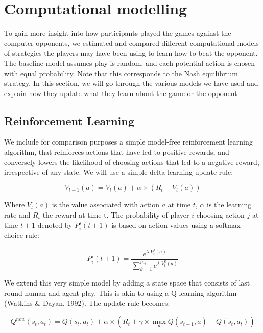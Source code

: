 \documentclass[man,floatsintext]{apa6}
\begin{document}
\newpage

\hypertarget{computational-modelling}{%
\section{Computational modelling}\label{computational-modelling}}

To gain more insight into how participants played the games against the computer opponents, we estimated and compared different computational models of strategies the players may have been using to learn how to beat the opponent. The baseline model assumes play is random, and each potential action is chosen with equal probability. Note that this corresponds to the Nash equilibrium strategy. In this section, we will go through the various models we have used and explain how they update what they learn about the game or the opponent

\hypertarget{reinforcement-learning}{%
\subsection{Reinforcement Learning}\label{reinforcement-learning}}

We include for comparison purposes a simple model-free reinforcement learning algorithm, that reinforces actions that have led to positive rewards, and conversely lowers the likelihood of choosing actions that led to a negative reward, irrespective of any state. We will use a simple delta learning update rule:

\[ V_{t+1}(a) = V_{t}(a) + \alpha \times ( R_{t}  - V_{t}(a)) \]

Where \(V_{t}(a)\) is the value associated with action \(a\) at time \(t\), \(\alpha\) is the learning rate and \(R_{t}\) the reward at time t. The probability of player \(i\) choosing action \(j\) at time \(t+1\) denoted by \(P_{i}^{j}(t+1)\) is based on action values using a softmax choice rule:

\[P_{i}^{j}(t+1) = \frac{e^{\lambda . V_{t}^{j}(a)}}{\sum_{k=1}^{m_{i}}e^{\lambda . V_{t}^{k}(a)}} \]

We extend this very simple model by adding a state space that consists of last round human and agent play. This is akin to using a Q-learning algorithm (Watkins \& Dayan, 1992). The update rule becomes:

\[ Q^{new}(s_{t},a_{t}) = Q(s_{t},a_{t}) + \alpha \times( R_{t}  + \gamma \times \underset{a}{\max}Q(s_{t+1},a) - Q(s_{t},a_{t}) ) \]
\end{document}
